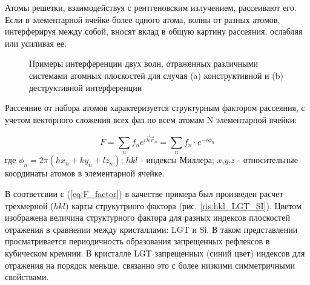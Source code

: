 \label{sec:structure_factor}
Атомы решетки, взаимодействуя с рентгеновским излучением, рассеивают его.
Если в элементарной ячейке более одного атома, волны от разных атомов,
 интерферируя между собой, вносят вклад в общую картину рассеяния,
 ослабляя или усиливая ее.

 \begin{figure}[H]
   \centering
   \hfill
   \caption{Примеры интерференции двух волн, отраженных различными системами атомных плоскостей для случая
   (a) конструктивной и (b) деструктивной интерференции}
   \label{ris:interference_by_plate}
 \end{figure}

Рассеяние от набора атомов характеризуется структурным фактором рассеяния,
 с учетом векторного сложения всех фаз по всем атомам N элементарной ячейки:

 \begin{equation}
   F = \sum_{n} f_n e^{ i\vec{h}\vec{r}_n} =   \sum_{n} f_n \cdot e^{-i\phi_n}
   \label{eq:F_factor}
  \end{equation}
\noindent
где $\phi_n = 2 \pi (hx_n+ky_n+lz_n)$;  $hkl$ - индексы Миллера; $x$,$y$,$z$ - относительные координаты
атомов в элементарной ячейке.

В соответсвии с (\ref{eq:F_factor}) в качестве примера был произведен расчет трехмерной ($hkl$)
карты струкутрного фактора (рис. \ref{ris:hkl_LGT_SI}).
Цветом изображена величина структурного фактора для разных
 индексов плоскостей отражения в сравнении между кристаллами: LGT и Si.
 В таком представлении просматривается периодичность образования запрещенных
 рефлексов в кубическом кремнии. В кристалле LGT запрещенных (синий цвет)
  индексов для отражения на порядок меньше, связанно это с более низкими
  симметричными свойствами.

